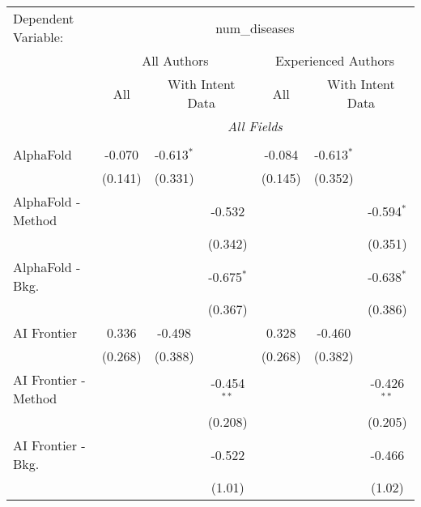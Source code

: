 \begingroup
\centering
\begin{tabular}{lcccccc}
   \tabularnewline \midrule \midrule
   Dependent Variable: & \multicolumn{6}{c}{num\_diseases}\\
 & \multicolumn{3}{c}{All Authors} & \multicolumn{3}{c}{Experienced Authors} \\
\cmidrule(lr){2-4} \cmidrule(lr){5-7}
 & \multicolumn{1}{c}{All} & \multicolumn{2}{c}{With Intent Data} & \multicolumn{1}{c}{All} & \multicolumn{2}{c}{With Intent Data} \\
\cmidrule(lr){2-2} \cmidrule(lr){3-4} \cmidrule(lr){5-5} \cmidrule(lr){6-7}
 & \multicolumn{6}{c}{\textit{All Fields}} \\ \\
   AlphaFold            & -0.070        & -0.613$^{*}$ &               & -0.084        & -0.613$^{*}$ &   \\   
                        & (0.141)       & (0.331)      &               & (0.145)       & (0.352)      &   \\   
   AlphaFold - Method   &               &              & -0.532        &               &              & -0.594$^{*}$\\   
                        &               &              & (0.342)       &               &              & (0.351)\\   
   AlphaFold - Bkg.     &               &              & -0.675$^{*}$  &               &              & -0.638$^{*}$\\   
                        &               &              & (0.367)       &               &              & (0.386)\\   
   AI Frontier          & 0.336         & -0.498       &               & 0.328         & -0.460       &   \\   
                        & (0.268)       & (0.388)      &               & (0.268)       & (0.382)      &   \\   
   AI Frontier - Method &               &              & -0.454$^{**}$ &               &              & -0.426$^{**}$\\   
                        &               &              & (0.208)       &               &              & (0.205)\\   
   AI Frontier - Bkg.   &               &              & -0.522        &               &              & -0.466\\   
                        &               &              & (1.01)        &               &              & (1.02)\\   

\end{tabular}
